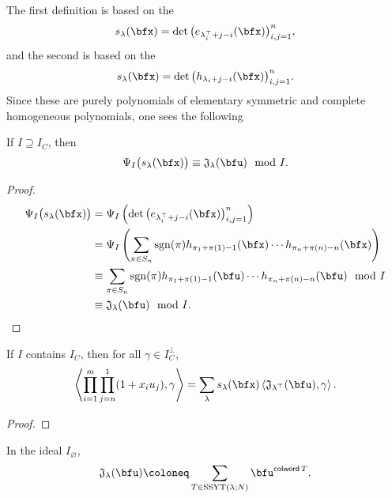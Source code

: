 \documentclass{article}
\newcommand{\ip}[1]{
    \left\langle
        {#1}
    \right\rangle
}
\newcommand*\colword{\operatorname{\mathsf{colword}}}
\newcommand*\frkJ{\mathfrak{J}}
\newcommand*\SSYT{\operatorname{SSYT}}
\newcommand*\sgn{\operatorname{sgn}}
\begin{document}
The first definition is based on the 
\[
    s_\lambda(\bfx)
    =
    \det\big(e_{\lambda^\top_i+j-i}(\bfx)\big)_{i,j=1}^n,
\]
and the second is based on the 
\[
    s_\lambda(\bfx)
    =
    \det\big(h_{\lambda_i+j-i}(\bfx)\big)_{i,j=1}^n.
\]
Since these are purely polynomials of elementary symmetric and complete homogeneous polynomials, one sees the following
\begin{definition}
    If $I \supseteq I_C$, then
    \[
        \Psi_I\big(s_\lambda(\bfx)\big)
        \equiv
        \frkJ_\lambda(\bfu)
        \mod I.
    \]
\end{definition}
\begin{proof}
    \begin{align*}
        \Psi_I\big(s_\lambda(\bfx)\big)
        &=
        \Psi_I \left(
            \det\big(e_{\lambda^\top_i+j-i}(\bfx)\big)_{i,j=1}^n
        \right)
        \\
        &=
        \Psi_I \left(
            \sum_{\pi \in S_n}
            \sgn(\pi)
            h_{\pi_1+\pi(1)-1}(\bfx)
            \cdots
            h_{\pi_n+\pi(n)-n}(\bfx)
        \right)
        \\
        &\equiv
        \sum_{\pi \in S_n}
        \sgn(\pi)
        h_{\pi_1+\pi(1)-1}(\bfu)
        \cdots
        h_{\pi_n+\pi(n)-n}(\bfu) \mod I
        \\
        &\equiv
        \frkJ_\lambda(\bfu) \mod I.
    \end{align*}
\end{proof}



\begin{theorem}
    If $I$ contains $I_C$, then for all $\gamma \in I_C^\perp$,
    \[
        \ip{
            \prod_{i=1}^m
            \prod_{j=n}^1
            (1 + x_iu_j),
            \gamma
        }
        =
        \sum_\lambda
        s_\lambda(\bfx)
        \ip{
        \frkJ_{\lambda^\top}(\bfu),\gamma
        }.
    \]
    \begin{proof}
    \end{proof}
\end{theorem}

\begin{theorem}
    In the ideal $I_\varnothing$,
    \[
        \frkJ_\lambda(\bfu)
        \coloneq
        \sum_{T \in \SSYT(\lambda;N)}
        \bfu^{\colword T}.
    \]
\end{theorem}
\end{document}
